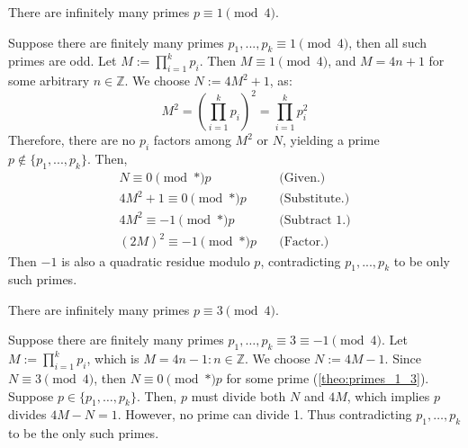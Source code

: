 \newpage

\begin{theo}

    There are infinitely many primes $p\equiv 1\pmod{4}$.
\end{theo}

\begin{Proof}

    Suppose there are finitely many primes $p_1,...,p_k\equiv 1\pmod{4}$, then all such primes are odd.
    Let $M:=\prod_{i=1}^{k}p_i$. Then $M\equiv 1\pmod{4}$, and $M = 4n+1$ for some arbitrary $n\in\mathbb{Z}$. 
    We choose $N:=4M^2+1$, as:
    \[M^2=\left(\prod_{i=1}^{k}p_i\right)^2=\prod_{i=1}^{k}p_i^2\]
    \noindent
    Therefore, there are no $p_i$ factors among $M^2$ or $N$, yielding a prime $p\notin\{p_1,...,p_k\}$. Then,
    \begin{align*}
        N\equiv 0\pmod*{p}&\quad \text{(Given.)}\\
        4M^2+1\equiv 0\pmod*{p} &\quad \text{(Substitute.)}\\
        4M^2\equiv -1\pmod*{p}&\quad \text{(Subtract 1.)}\\
        (2M)^2\equiv -1\pmod*{p} &\quad \text{(Factor.)}
    \end{align*}
    Then $-1$ is also a quadratic residue modulo $p$, contradicting $p_1,...,p_k$ to be only such primes.

\end{Proof}

\begin{theo}

    There are infinitely many primes $p\equiv 3\pmod{4}$.
\end{theo}

\begin{Proof}

    Suppose there are finitely many primes $p_1, \dots, p_k \equiv 3\equiv-1 \pmod{4}$. 
    Let \( M := \prod_{i=1}^{k} p_i \), which is $M=4n-1: n \in \mathbb{Z}$.
    We choose \( N := 4M - 1 \). Since \( N \equiv 3 \pmod{4} \), then $N\equiv 0 \pmod*{p}$ for some prime  (\ref{theo:primes_1_3}).
    Suppose $p\in\{p_1, \dots, p_k\}$. Then, \( p \) must divide both \( N \) and \( 4M \), which implies \( p \) divides \( 4M - N = 1 \). However, no prime can divide 1. Thus contradicting $p_1, \dots, p_k$ to be the only such primes. 

\end{Proof}



